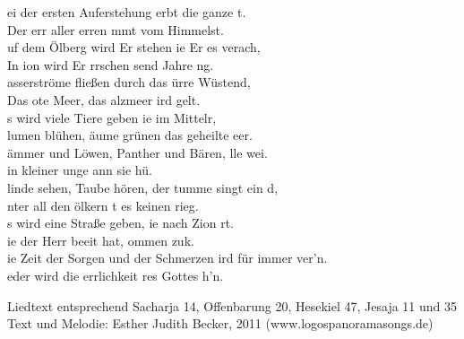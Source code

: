 
ei der ersten Auferstehung erbt die ganze t.\\
Der err aller erren mmt vom Himmelst.\\
uf dem Ölberg wird Er stehen ie Er es verach,\\
In ion wird Er rrschen send Jahre ng.\\

asserströme fließen durch das ürre Wüstend,\\
Das ote Meer, das alzmeer ird gelt.\\
s wird viele Tiere geben ie im Mittelr,\\
lumen blühen, äume grünen  das geheilte eer.\\

ämmer und Löwen, Panther und Bären, lle wei.\\
in kleiner unge ann sie hü.\\
linde sehen, Taube hören, der tumme singt ein d,\\
nter all den ölkern t es keinen rieg.\\

s wird eine Straße geben, ie nach Zion rt.\\
ie der Herr beeit hat, ommen zuk.\\
ie Zeit der Sorgen und der Schmerzen ird für immer ver'n.\\
eder wird die errlichkeit res Gottes h'n.\\

\begin{footnotesize}
Liedtext entsprechend Sacharja 14, Offenbarung 20, Hesekiel 47, Jesaja 11 und 35\\
Text und Melodie: Esther Judith Becker, 2011 (www.logospanoramasongs.de)
\end{footnotesize}
